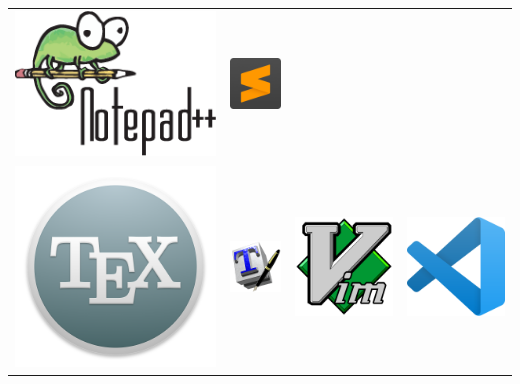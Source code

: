 \documentclass{beamer}
\begin{document}
\begin{frame}[plain]{}
\begin{tabular}{cccc}
    \includegraphics[width=0.21\linewidth]{figures/logo-notepad++} &
    \includegraphics[width=0.21\linewidth]{figures/logo-sublime-text-3} \\
    \includegraphics[width=0.21\linewidth]{figures/logo-texshop} &
    \includegraphics[width=0.21\linewidth]{figures/logo-texworks} &
    \includegraphics[width=0.21\linewidth]{figures/logo-vim} &
    \includegraphics[width=0.21\linewidth]{figures/logo-vscode}
  \end{tabular}
\end{frame}
\end{document}
